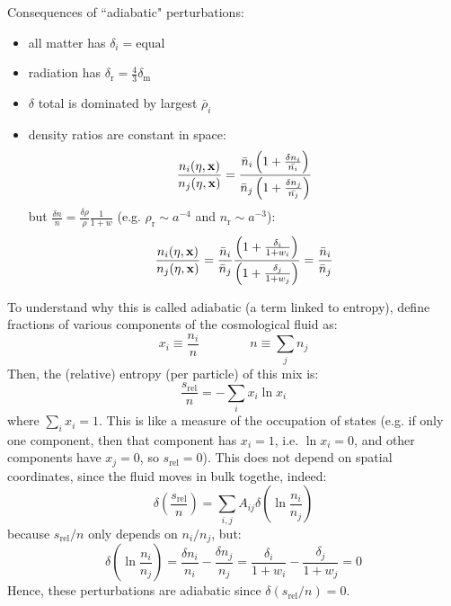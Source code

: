 Consequences of ``adiabatic" perturbations:
\begin{itemize}
  \item all matter has $ \delta_i = \text{equal} $
  \item radiation has $ \delta_\text{r} = \frac{4}{3} \delta_\text{m} $
  \item $ \delta $ total is dominated by largest $ \bar{\rho}_i $
  \item density ratios are constant in space:
    \begin{equation*}
      \frac{n_i(\eta , \mathbf{x})}{n_j(\eta , \mathbf{x})} = \frac{\bar{n}_i \left( 1 + \frac{\delta n_i}{\bar{n_i}} \right)}{\bar{n}_j \left( 1 + \frac{\delta n_j}{\bar{n_j}} \right)}
    \end{equation*}
    but $ \frac{\delta n}{n} = \frac{\delta \rho}{\rho} \frac{1}{1 + w} $ (e.g. $ \rho_\text{r} \sim a^{-4} $ and $ n_\text{r} \sim a^{-3} $):
    \begin{equation*}
      \frac{n_i(\eta , \mathbf{x})}{n_j(\eta , \mathbf{x})} = \frac{\bar{n}_i}{\bar{n}_j} \frac{\left( 1 + \frac{\delta_i}{1 + w_i} \right)}{\left( 1 + \frac{\delta_j}{1 + w_j} \right)} = \frac{\bar{n}_i}{\bar{n}_j}
    \end{equation*}
\end{itemize}

To understand why this is called adiabatic (a term linked to entropy), define fractions of various components of the cosmological fluid as:
\begin{equation*}
  x_i \equiv \frac{n_i}{n}
  \qquad \qquad
  n \equiv \sum_j n_j
\end{equation*}
Then, the (relative) entropy (per particle) of this mix is:
\begin{equation*}
  \frac{s_\text{rel}}{n} = - \sum_i x_i \ln x_i
\end{equation*}
where $ \sum_i x_i = 1 $. This is like a measure of the occupation of states (e.g. if only one component, then that component has $ x_i = 1 $, i.e. $ \ln x_i = 0 $, and other components have $ x_j = 0 $, so $ s_\text{rel} = 0 $). This does not depend on spatial coordinates, since the fluid moves in bulk togethe, indeed:
\begin{equation*}
  \delta \left( \frac{s_\text{rel}}{n} \right) = \sum_{i,j} A_{ij} \delta \left( \ln \frac{n_i}{n_j} \right)
\end{equation*}
because $ s_\text{rel} / n $ only depends on $ n_i / n_j $, but:
\begin{equation*}
  \delta \left( \ln \frac{n_i}{n_j} \right) = \frac{\delta n_i}{n_i} - \frac{\delta n_j}{n_j} = \frac{\delta_i}{1 + w_i} - \frac{\delta_j}{1 + w_j} = 0
\end{equation*}
Hence, these perturbations are adiabatic since $ \delta (s_\text{rel} / n) = 0 $.

